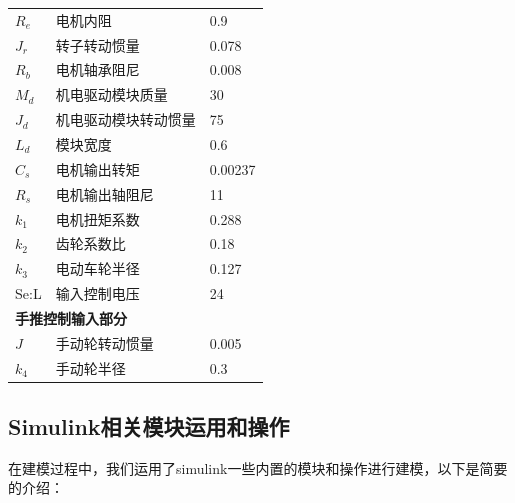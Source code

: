 \begin{table}[H]
\begin{longtable}{l|l|l}
		$ R_e $ & 电机内阻 & 0.9 \\
		$ J_r $ & 转子转动惯量 & 0.078 \\
		$ R_b $ & 电机轴承阻尼 & 0.008 \\
		$ M_d $ & 机电驱动模块质量 & 30 \\
		$ J_d $ & 机电驱动模块转动惯量 & 75 \\
		$ L_d $ & 模块宽度 & 0.6 \\
		$ C_s $ & 电机输出转矩 & 0.00237\\
		$ R_s $ & 电机输出轴阻尼 & 11 \\
		$ k_1 $ & 电机扭矩系数 & 0.288 \\ %
		$ k_2 $ & 齿轮系数比 & 0.18 \\ %
		$ k_3 $ & 电动车轮半径 & 0.127 \\ %
		Se:L & 输入控制电压 & 24 \\
		\midrule
		\multicolumn{3}{l}{\textbf{手推控制输入部分}}\\
		\midrule
		$ J $ & 手动轮转动惯量 & 0.005 \\
		$ k_4 $ & 手动轮半径 & 0.3 \\ %
		\bottomrule
	\end{longtable}
\end{table}

\clearpage

\subsection{Simulink相关模块运用和操作}

在建模过程中，我们运用了simulink一些内置的模块和操作进行建模，以下是简要的介绍：

